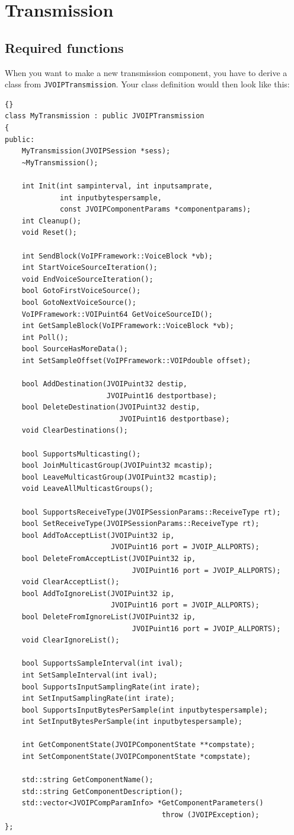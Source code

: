 	\section{Transmission}

		\subsection{Required functions}

		When you want to make a new transmission component, you have to derive
		a class from {\tt JVOIPTransmission}. Your class definition would then
		look like this:
		\begin{lstlisting}[frame=tb]{}
class MyTransmission : public JVOIPTransmission
{
public:
	MyTransmission(JVOIPSession *sess);
	~MyTransmission();
	
	int Init(int sampinterval, int inputsamprate, 
	         int inputbytespersample, 
	         const JVOIPComponentParams *componentparams);
	int Cleanup();
	void Reset();
	
	int SendBlock(VoIPFramework::VoiceBlock *vb);
	int StartVoiceSourceIteration();
	void EndVoiceSourceIteration();
	bool GotoFirstVoiceSource();
	bool GotoNextVoiceSource();
	VoIPFramework::VOIPuint64 GetVoiceSourceID();
	int GetSampleBlock(VoIPFramework::VoiceBlock *vb);
	int Poll();
	bool SourceHasMoreData();
	int SetSampleOffset(VoIPFramework::VOIPdouble offset);
	
	bool AddDestination(JVOIPuint32 destip,
	                    JVOIPuint16 destportbase);
	bool DeleteDestination(JVOIPuint32 destip,
	                       JVOIPuint16 destportbase);
	void ClearDestinations();

	bool SupportsMulticasting();	
	bool JoinMulticastGroup(JVOIPuint32 mcastip);
	bool LeaveMulticastGroup(JVOIPuint32 mcastip);
	void LeaveAllMulticastGroups();

	bool SupportsReceiveType(JVOIPSessionParams::ReceiveType rt);
	bool SetReceiveType(JVOIPSessionParams::ReceiveType rt);
	bool AddToAcceptList(JVOIPuint32 ip,
	                     JVOIPuint16 port = JVOIP_ALLPORTS);
	bool DeleteFromAcceptList(JVOIPuint32 ip,
	                          JVOIPuint16 port = JVOIP_ALLPORTS);
	void ClearAcceptList();
	bool AddToIgnoreList(JVOIPuint32 ip,
	                     JVOIPuint16 port = JVOIP_ALLPORTS);
	bool DeleteFromIgnoreList(JVOIPuint32 ip,
	                          JVOIPuint16 port = JVOIP_ALLPORTS);
	void ClearIgnoreList();

	bool SupportsSampleInterval(int ival);
	int SetSampleInterval(int ival);
	bool SupportsInputSamplingRate(int irate);
	int SetInputSamplingRate(int irate);
	bool SupportsInputBytesPerSample(int inputbytespersample);
	int SetInputBytesPerSample(int inputbytespersample);

	int GetComponentState(JVOIPComponentState **compstate);
	int SetComponentState(JVOIPComponentState *compstate);
	
	std::string GetComponentName();
	std::string GetComponentDescription();
	std::vector<JVOIPCompParamInfo> *GetComponentParameters() 
	                                 throw (JVOIPException);
};
		\end{lstlisting}

